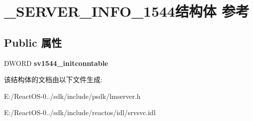 \hypertarget{struct___s_e_r_v_e_r___i_n_f_o__1544}{}\section{\+\_\+\+S\+E\+R\+V\+E\+R\+\_\+\+I\+N\+F\+O\+\_\+1544结构体 参考}
\label{struct___s_e_r_v_e_r___i_n_f_o__1544}
\subsection*{Public 属性}
\begin{DoxyCompactItemize}
\item 
\mbox{\label{struct___s_e_r_v_e_r___i_n_f_o__1544_a6ae0d44b6733cada7d150a454e9eb328}} 
D\+W\+O\+RD {\bfseries sv1544\+\_\+initconntable}
\end{DoxyCompactItemize}


该结构体的文档由以下文件生成\+:\begin{DoxyCompactItemize}
\item 
E\+:/\+React\+O\+S-\/0../sdk/include/psdk/lmserver.\+h\item 
E\+:/\+React\+O\+S-\/0../sdk/include/reactos/idl/srvsvc.\+idl\end{DoxyCompactItemize}
